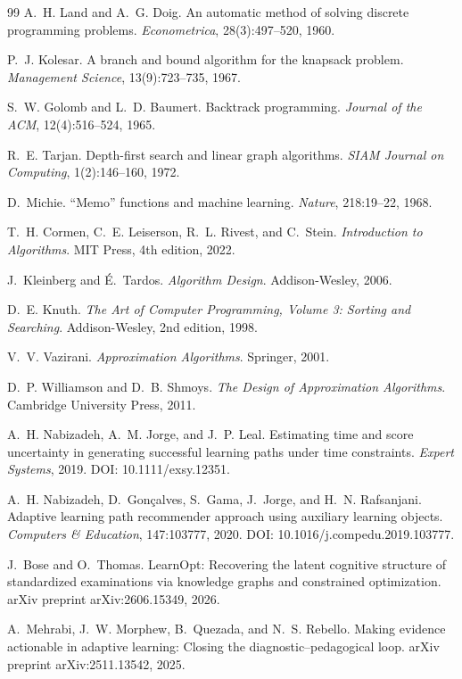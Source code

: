 \begin{thebibliography}{99}
 A.~H. Land and A.~G. Doig. An automatic method of solving discrete programming problems. \emph{Econometrica}, 28(3):497--520, 1960.

 P.~J. Kolesar. A branch and bound algorithm for the knapsack problem. \emph{Management Science}, 13(9):723--735, 1967.

 S.~W. Golomb and L.~D. Baumert. Backtrack programming. \emph{Journal of the ACM}, 12(4):516--524, 1965.

 R.~E. Tarjan. Depth-first search and linear graph algorithms. \emph{SIAM Journal on Computing}, 1(2):146--160, 1972.

 D.~Michie. ``Memo'' functions and machine learning. \emph{Nature}, 218:19--22, 1968.

 T.~H. Cormen, C.~E. Leiserson, R.~L. Rivest, and C.~Stein. \emph{Introduction to Algorithms}. MIT Press, 4th edition, 2022.

 J.~Kleinberg and \'E.~Tardos. \emph{Algorithm Design}. Addison-Wesley, 2006.

 D.~E. Knuth. \emph{The Art of Computer Programming, Volume 3: Sorting and Searching}. Addison-Wesley, 2nd edition, 1998.

 V.~V. Vazirani. \emph{Approximation Algorithms}. Springer, 2001.

 D.~P. Williamson and D.~B. Shmoys. \emph{The Design of Approximation Algorithms}. Cambridge University Press, 2011.

 A.~H. Nabizadeh, A.~M. Jorge, and J.~P. Leal. Estimating time and score uncertainty in generating successful learning paths under time constraints. \emph{Expert Systems}, 2019. DOI: 10.1111/exsy.12351.

 A.~H. Nabizadeh, D.~Gon\c{c}alves, S.~Gama, J.~Jorge, and H.~N. Rafsanjani. Adaptive learning path recommender approach using auxiliary learning objects. \emph{Computers \& Education}, 147:103777, 2020. DOI: 10.1016/j.compedu.2019.103777.

 J.~Bose and O.~Thomas. LearnOpt: Recovering the latent cognitive structure of standardized examinations via knowledge graphs and constrained optimization. arXiv preprint arXiv:2606.15349, 2026.

 A.~Mehrabi, J.~W. Morphew, B.~Quezada, and N.~S. Rebello. Making evidence actionable in adaptive learning: Closing the diagnostic--pedagogical loop. arXiv preprint arXiv:2511.13542, 2025.


\end{thebibliography}
